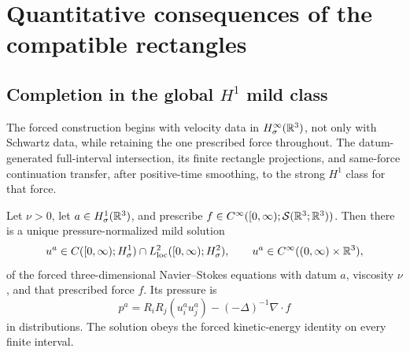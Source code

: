 \section{Quantitative consequences of the compatible rectangles}
\label{f:sec:quantitative-consequences}

\subsection[Completion in the global \texorpdfstring{\(H^1\)}{H1} mild class]
{Completion in the global \(H^1\) mild class}

The forced construction begins with velocity data in
\(H^\infty_\sigma(\mathbb R^3)\), not only with Schwartz data, while retaining the
one prescribed force throughout. The datum-generated full-interval
intersection, its finite rectangle projections, and same-force continuation
transfer, after positive-time smoothing, to the strong \(H^1\) class for that
force.

\begin{theorem}
\label{f:thm:qc-global-H1-completion}
Let \(\nu>0\), let \(a\in H^1_\sigma(\mathbb R^3)\), and prescribe
\(f\in C^\infty([0,\infty);\mathcal S(\mathbb R^3;\mathbb R^3))\). Then there is a unique
pressure-normalized mild solution
\begin{equation}
 u^a\in C([0,\infty);H^1_\sigma)
 \cap L^2_{\rm loc}([0,\infty);H^2_\sigma),
 \qquad
 u^a\in C^\infty((0,\infty)\times\mathbb R^3),
 \label{f:eq:qc-global-H1-class}
\end{equation}
of the forced three-dimensional Navier--Stokes equations with datum \(a\),
viscosity \(\nu\), and that prescribed force \(f\).  Its pressure is
\[
 p^a=R_iR_j(u_i^a u_j^a)-(-\Delta)^{-1}\nabla\cdot f
\]
in distributions.  The solution obeys the forced kinetic-energy identity on
every finite interval.
\end{theorem}

